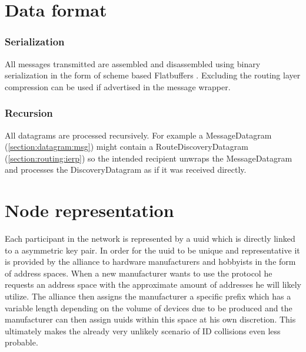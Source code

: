 \documentclass[a4paper]{report}
\begin{document}
	    \section{Data format}
    	    \subsubsection{Serialization}
    	        All messages transmitted are assembled and disassembled using binary serialization in the form of scheme based Flatbuffers \cite{flatbuffers}. Excluding the routing layer compression can be used if advertised in the message wrapper.
    	        
    	    \subsubsection{Recursion}
    	        All \glspl{datagram} are processed recursively. For example a MessageDatagram (\ref{section:datagram:msg}) might contain a RouteDiscoveryDatagram (\ref{section:routing:ierp}) so the intended recipient unwraps the MessageDatagram and processes the DiscoveryDatagram as if it was received directly.
    	        
        \section{Node representation}
            Each participant in the network is represented by a \acrlong{uuid} which is directly linked to a asymmetric key pair. In order for the \acrshort{uuid} to be unique and representative it is provided by the alliance to hardware manufacturers and hobbyists in the form of address spaces. When a new manufacturer wants to use the protocol he requests an address space with the approximate amount of addresses he will likely utilize. The alliance then assigns the manufacturer a specific prefix which has a variable length depending on the volume of devices due to be produced and the manufacturer can then assign \acrshort{uuid}s within this space at his own discretion. This ultimately makes the already very unlikely scenario of ID collisions even less probable.
		    
\end{document}
